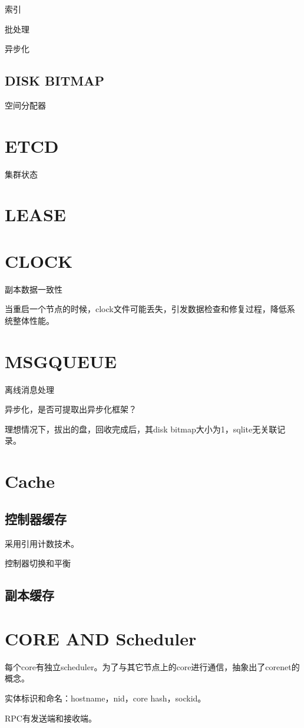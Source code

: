 索引

批处理

异步化

\subsection{DISK BITMAP}

空间分配器

\section{ETCD}

集群状态

\section{LEASE}

\section{CLOCK}

副本数据一致性

当重启一个节点的时候，clock文件可能丢失，引发数据检查和修复过程，降低系统整体性能。

\section{MSGQUEUE}

离线消息处理

异步化，是否可提取出异步化框架？

理想情况下，拔出的盘，回收完成后，其disk bitmap大小为1，sqlite无关联记录。

\section{Cache}

\subsection{控制器缓存}

采用引用计数技术。

控制器切换和平衡

\subsection{副本缓存}

\section{CORE AND Scheduler}

每个core有独立scheduler。为了与其它节点上的core进行通信，抽象出了corenet的概念。

实体标识和命名：hostname，nid，core hash，sockid。

RPC有发送端和接收端。
